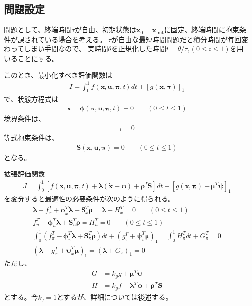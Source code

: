 \documentclass[a4paper]{bxjsarticle}
\begin{document}
	\subsection{問題設定}
	問題として、終端時間$\tau$が自由、初期状態は$\bm{x}_0 =\bm{x}_{\text{init}}$に固定、終端時間に拘束条件が課されている場合を考える。
	$\tau$が自由な最短時間問題だと積分時間が毎回変わってしまい手間なので、
	実時間$\theta$を正規化した時間$t=\theta/\tau, (0\leq t \leq 1)$を用いることにする。
	
	このとき、最小化すべき評価関数は
	\begin{align}
		I = \int_{0}^{1}f(\bm{x},\bm{u},\bm{\pi},t)dt + [g(\bm{x},\bm{\pi})]_1
	\end{align}
	で、状態方程式は
	\begin{align}
		\dot{\bm{x}} - \bm{\phi}(\bm{x},\bm{u},\bm{\pi},t) = 0 \qquad (0\leq t \leq 1) \label{state-eq}
	\end{align}
	境界条件は、
	\begin{align}
		[\bm{\psi}(\bm{x},\bm{\pi})]_1 = 0 \label{bc}
	\end{align}
	等式拘束条件は、
	\begin{align}
	\bm{S}(\bm{x},\bm{u},\bm{\pi}) = 0\qquad (0\leq t \leq 1) \label{eqcon}
	\end{align}
	となる。
	
	拡張評価関数
	\begin{align}
		J = \int_{0}^{1}[f(\bm{x},\bm{u},\bm{\pi},t) + \bm{\lambda}(\dot{\bm{x}} - \bm{\phi}) + \bm{\rho}^T \bm{S}]dt + [g(\bm{x},\bm{\pi}) + \bm{\mu}^T \bm{\psi}]_1
	\end{align}
	を変分すると最適性の必要条件が次のように得られる。
	\begin{align}
		\dot{\bm{\lambda}} - f_x^T + \bm{\phi}^T_x \bm{\lambda}  - \bm{S}_x^T \bm{\rho}  = \dot{\bm{\lambda}} - H_x^T = 0 \qquad (0\leq t \leq 1)\\
		f_u^T - \bm{\phi}_u^T	 \bm{\lambda + \bm{S}}_u^T \bm{\rho} = H_u^T = 0 \qquad (0\leq t \leq 1)\\
		\int_{0}^{1}(f_{\pi}^T - \bm{\phi}_\pi^T \bm{\lambda}+\bm{S}^T_{\pi}\bm{\rho})dt + (g_{\pi}^T+\bm{\psi}^T_{\pi}\bm{\mu})_1 =  \int_{0}^{1}H_{\pi}^Tdt + G_{\pi}^T  = 0 \\
		(\bm{\lambda} + g_x^T + \bm{\psi}_x^T \bm{\mu})_1 = (\bm{\lambda} + G_{x})_1 =  0
	\end{align}
	ただし、
	\begin{align}
		G&= k_g g + \bm{\mu}^T \bm{\psi}\\
		H& = k_g f - \bm{\lambda}^T \bm{\phi}+ \bm{\rho}^T  \bm{S}
	\end{align}
	とする。今$k_g=1$とするが、詳細については後述する。
	
\end{document}
